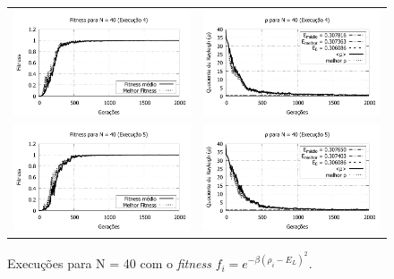 \begin{figure}[p]
\begin{tabular}{@{}cc@{}}
		\includegraphics[width=.40\textwidth]{figs/resultados/fitnessEL/N-40_E-4_fitness-extendido.pdf} &
    \includegraphics[width=.40\textwidth]{figs/resultados/fitnessEL/N-40_E-4_rho_extendido.pdf}		\\
		\includegraphics[width=.40\textwidth]{figs/resultados/fitnessEL/N-40_E-5_fitness-extendido.pdf} &
    \includegraphics[width=.40\textwidth]{figs/resultados/fitnessEL/N-40_E-5_rho_extendido.pdf}
  \end{tabular}
  \caption{Execuções para N = 40 com o \textit{fitness} $f_i = e^{-\beta(\rho_i - E_L)^2}$.}
	\label{fig:execucoes_N40_EL}
	\end{figure}
	
	
